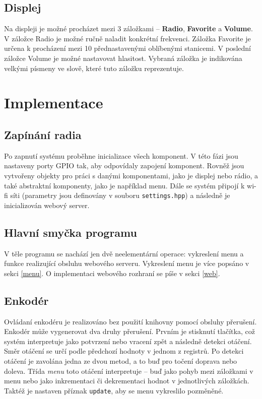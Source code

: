 \documentclass{article}
\begin{document}
	\subsection{Displej}
	Na displeji je možné procházet mezi 3 záložkami -- \textbf{Radio}, \textbf{Favorite} a \textbf{Volume}. V záložce Radio je možné ručně naladit konkrétní frekvenci. Záložka Favorite je určena k procházení mezi 10 přednastavenými oblíbenými stanicemi. V poslední záložce Volume je možné nastavovat hlasitost. Vybraná záložka je indikována velkými písmeny ve slově, které tuto záložku reprezentuje. 
	
	\section{Implementace}
	\subsection{Zapínání radia}
	Po zapnutí systému proběhne inicializace všech komponent. V této fázi jsou nastaveny porty GPIO tak, aby odpovídaly zapojení komponent. Rovněž jsou vytvořeny objekty pro práci s danými komponentami, jako je displej nebo rádio, a také abstraktní komponenty, jako je například menu. Dále se systém připojí k wi-fi síti (parametry jsou definovány v souboru \texttt{settings.hpp}) a následně je inicializován webový server. 
	
	\subsection{Hlavní smyčka programu}
	V těle programu se nachází jen dvě neelementární operace: vykreslení menu a funkce realizující obsluhu webového serveru. Vykreslení menu je více popsáno v sekci \ref{menu}. O implementaci webového rozhraní se píše v sekci \ref{web}.
	
	
	\subsection{Enkodér}
	Ovládaní enkodéru je realizováno bez použití knihovny pomocí obsluhy přerušení. Enkodér může vygenerovat dva druhy přerušení. Prvním je stisknutí tlačítka, což systém interpretuje jako potvrzení nebo vracení zpět a následně detekci otáčení. Směr otáčení se určí podle předchozí hodnoty v jednom z registrů. Po detekci otáčení je zavolána jedna ze dvou metod, a to buď pro točení doprava nebo doleva. Třída \emph{menu} toto otáčení interpretuje -- buď jako pohyb mezi záložkami v menu nebo jako inkrementaci či dekrementaci hodnot v jednotlivých záložkách. Taktéž je nastaven příznak \verb|update|, aby se menu vykreslilo pozměněné. 
	
\end{document}
